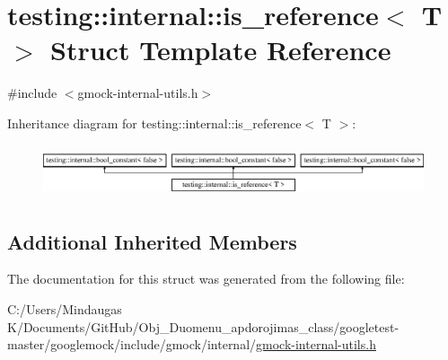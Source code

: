 \hypertarget{structtesting_1_1internal_1_1is__reference}{}\section{testing\+::internal\+::is\+\_\+reference$<$ T $>$ Struct Template Reference}
\label{structtesting_1_1internal_1_1is__reference}


{\ttfamily \#include $<$gmock-\/internal-\/utils.\+h$>$}

Inheritance diagram for testing\+::internal\+::is\+\_\+reference$<$ T $>$\+:\begin{figure}[H]
\begin{center}
\leavevmode
\includegraphics[height=1.562064cm]{dd/de6/structtesting_1_1internal_1_1is__reference}
\end{center}
\end{figure}
\subsection*{Additional Inherited Members}


The documentation for this struct was generated from the following file\+:\begin{DoxyCompactItemize}
\item 
C\+:/\+Users/\+Mindaugas K/\+Documents/\+Git\+Hub/\+Obj\+\_\+\+Duomenu\+\_\+apdorojimas\+\_\+class/googletest-\/master/googlemock/include/gmock/internal/\mbox{\hyperlink{googletest-master_2googlemock_2include_2gmock_2internal_2gmock-internal-utils_8h}{gmock-\/internal-\/utils.\+h}}\end{DoxyCompactItemize}
